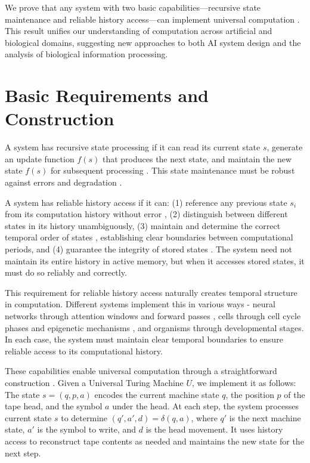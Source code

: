 \documentclass[12pt]{article}
\begin{document}
We prove that any system with two basic capabilities---recursive state maintenance and reliable history access---can implement universal computation \cite{bennett1989time,boyle2024memory}. This result unifies our understanding of computation across artificial and biological domains, suggesting new approaches to both AI system design and the analysis of biological information processing.

\section{Basic Requirements and Construction}
A system has recursive state processing if it can read its current state $s$, generate an update function $f(s)$ that produces the next state, and maintain the new state $f(s)$ for subsequent processing \cite{manuri2019state}. This state maintenance must be robust against errors and degradation \cite{yang2013survey}.

A system has reliable history access if it can: (1) reference any previous state $s_i$ from its computation history without error \cite{fu2024memory}, (2) distinguish between different states in its history unambiguously, (3) maintain and determine the correct temporal order of states \cite{berridge2014cell,pastor2020computation}, establishing clear boundaries between computational periods, and (4) guarantee the integrity of stored states \cite{lovkvist2021using}. The system need not maintain its entire history in active memory, but when it accesses stored states, it must do so reliably and correctly.

This requirement for reliable history access naturally creates temporal structure in computation. Different systems implement this in various ways - neural networks through attention windows and forward passes \cite{martini2015information,quentin2019differential}, cells through cell cycle phases and epigenetic mechanisms \cite{bruno2022epigenetic}, and organisms through developmental stages. In each case, the system must maintain clear temporal boundaries to ensure reliable access to its computational history.

These capabilities enable universal computation through a straightforward construction \cite{deutsch1995universality,bennett1989time}. Given a Universal Turing Machine $U$, we implement it as follows: The state $s = (q, p, a)$ encodes the current machine state $q$, the position $p$ of the tape head, and the symbol $a$ under the head. At each step, the system processes current state $s$ to determine $(q', a', d) = \delta(q, a)$, where $q'$ is the next machine state, $a'$ is the symbol to write, and $d$ is the head movement. It uses history access to reconstruct tape contents as needed and maintains the new state for the next step.
\end{document}
